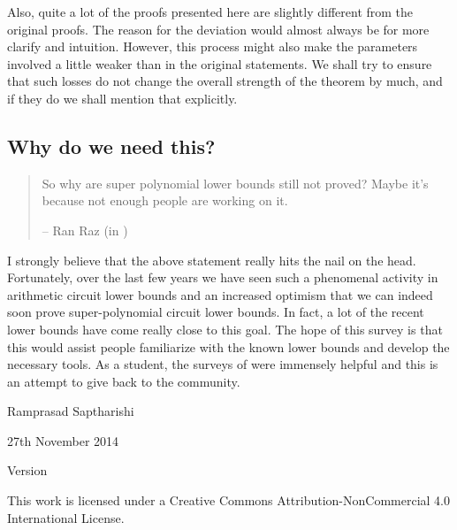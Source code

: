 Also, quite a lot of the proofs presented here are slightly different from the original proofs. The reason for the deviation would almost always be for more clarify and intuition. However, this process might also make the parameters involved a little weaker than in the original statements. We shall try to ensure that such losses do not change the overall strength of the theorem by much, and if they do we shall mention that explicitly. \\

\subsection*{Why do we need this?}

\begin{quote}
So why are super polynomial lower bounds still not proved?  Maybe it's because not enough people are working on it.  
\begin{flushright}
-- Ran Raz (in \cite{raz10fool})
\end{flushright}
\end{quote}


I strongly believe that the above statement really hits the nail on the head. Fortunately, over the last few years we have seen such a phenomenal activity in arithmetic circuit lower bounds and an increased optimism that we can indeed soon prove super-polynomial circuit lower bounds. In fact, a lot of the recent lower bounds have come really close to this goal. The hope of this survey is that this would assist people familiarize with the known lower bounds and develop the necessary tools. As a student, the surveys of \cite{sy,ckw11} were immensely helpful and this is an attempt to give back to the community. 

\vspace*{2cm}

\noindent
Ramprasad Saptharishi

\noindent
27th November 2014

\noindent 
Version \currentversion\\

\noindent
\ccbync

\medskip

\noindent
\parbox[c][4em][s]{0.33\textwidth}{\footnotesize This work is licensed under a Creative Commons Attribution-NonCommercial 4.0 International License. } 

